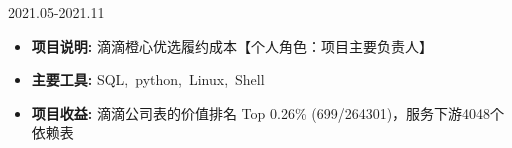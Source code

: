 \documentclass{resume}
\begin{document}
\medskip













                      {2021.05-2021.11}

\begin{itemize}  [parsep=0.5ex]

  \item   \textbf{  项目说明:  }   { 滴滴橙心优选履约成本【个人角色：项目主要负责人】 } 
  \item   \textbf{  主要工具:  }   {  SQL,\ python,\ Linux,\ Shell }
  \item   \textbf{  项目收益:  }   {  滴滴公司表的价值排名 Top 0.26\% (699/264301)，服务下游4048个依赖表 }

\end{itemize}
\end{document}
